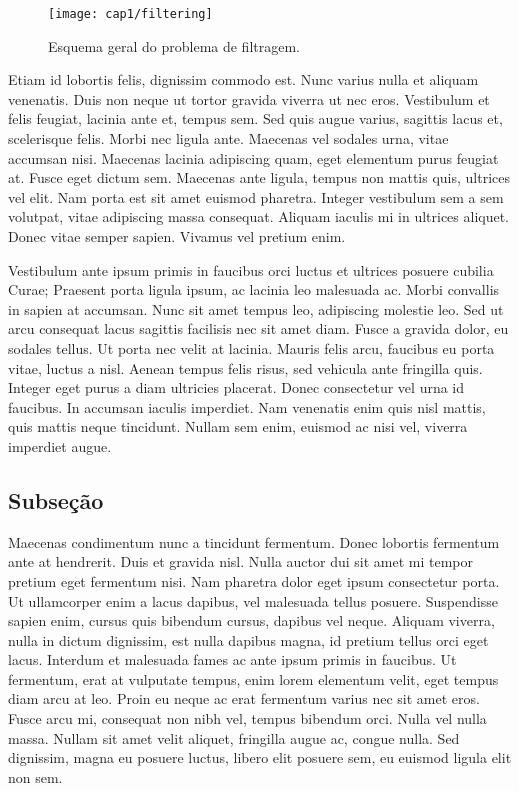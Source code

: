 \begin{figure}[htb]
\centering
	\texttt{[image: cap1/filtering]}
\caption{Esquema geral do problema de filtragem.}
\label{fig:filtering}
\end{figure}

Etiam id lobortis felis, dignissim commodo est. Nunc varius nulla et aliquam venenatis. Duis non neque ut tortor gravida viverra ut nec eros. Vestibulum et felis feugiat, lacinia ante et, tempus sem. Sed quis augue varius, sagittis lacus et, scelerisque felis. Morbi nec ligula ante. Maecenas vel sodales urna, vitae accumsan nisi. Maecenas lacinia adipiscing quam, eget elementum purus feugiat at. Fusce eget dictum sem. Maecenas ante ligula, tempus non mattis quis, ultrices vel elit. Nam porta est sit amet euismod pharetra. Integer vestibulum sem a sem volutpat, vitae adipiscing massa consequat. Aliquam iaculis mi in ultrices aliquet. Donec vitae semper sapien. Vivamus vel pretium enim.

Vestibulum ante ipsum primis in faucibus orci luctus et ultrices posuere cubilia Curae; Praesent porta ligula ipsum, ac lacinia leo malesuada ac. Morbi convallis in sapien at accumsan. Nunc sit amet tempus leo, adipiscing molestie leo. Sed ut arcu consequat lacus sagittis facilisis nec sit amet diam. Fusce a gravida dolor, eu sodales tellus. Ut porta nec velit at lacinia. Mauris felis arcu, faucibus eu porta vitae, luctus a nisl. Aenean tempus felis risus, sed vehicula ante fringilla quis. Integer eget purus a diam ultricies placerat. Donec consectetur vel urna id faucibus. In accumsan iaculis imperdiet. Nam venenatis enim quis nisl mattis, quis mattis neque tincidunt. Nullam sem enim, euismod ac nisi vel, viverra imperdiet augue.

\subsection{Subse\c{c}\~{a}o}
\label{sec:subsec01}

Maecenas condimentum nunc a tincidunt fermentum. Donec lobortis fermentum ante at hendrerit. Duis et gravida nisl. Nulla auctor dui sit amet mi tempor pretium eget fermentum nisi. Nam pharetra dolor eget ipsum consectetur porta. Ut ullamcorper enim a lacus dapibus, vel malesuada tellus posuere. Suspendisse sapien enim, cursus quis bibendum cursus, dapibus vel neque. Aliquam viverra, nulla in dictum dignissim, est nulla dapibus magna, id pretium tellus orci eget lacus. Interdum et malesuada fames ac ante ipsum primis in faucibus. Ut fermentum, erat at vulputate tempus, enim lorem elementum velit, eget tempus diam arcu at leo. Proin eu neque ac erat fermentum varius nec sit amet eros. Fusce arcu mi, consequat non nibh vel, tempus bibendum orci. Nulla vel nulla massa. Nullam sit amet velit aliquet, fringilla augue ac, congue nulla. Sed dignissim, magna eu posuere luctus, libero elit posuere sem, eu euismod ligula elit non sem.

